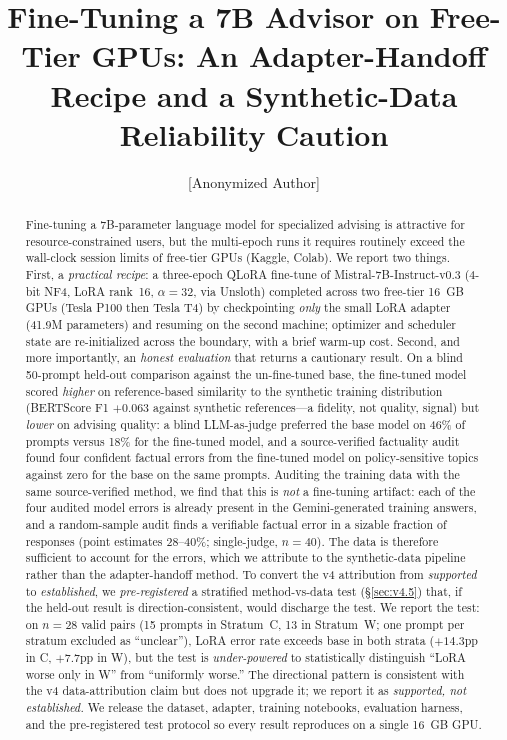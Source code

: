 \documentclass[11pt]{article}
\title{Fine-Tuning a 7B Advisor on Free-Tier GPUs: An Adapter-Handoff Recipe and a Synthetic-Data Reliability Caution}
\author{[Anonymized Author] \\
  [Anonymized Affiliation]}
\date{}
\begin{document}
\maketitle

\begin{abstract}
Fine-tuning a 7B-parameter language model for specialized advising is attractive for resource-constrained users, but the multi-epoch runs it requires routinely exceed the wall-clock session limits of free-tier GPUs (Kaggle, Colab). We report two things. First, a \emph{practical recipe}: a three-epoch QLoRA fine-tune of Mistral-7B-Instruct-v0.3 (4-bit NF4, LoRA rank~16, $\alpha=32$, via Unsloth) completed across two free-tier 16~GB GPUs (Tesla P100 then Tesla T4) by checkpointing \emph{only} the small LoRA adapter (41.9M parameters) and resuming on the second machine; optimizer and scheduler state are re-initialized across the boundary, with a brief warm-up cost. Second, and more importantly, an \emph{honest evaluation} that returns a cautionary result. On a blind 50-prompt held-out comparison against the un-fine-tuned base, the fine-tuned model scored \emph{higher} on reference-based similarity to the synthetic training distribution (BERTScore F1 $+0.063$ against synthetic references---a fidelity, not quality, signal) but \emph{lower} on advising quality: a blind LLM-as-judge preferred the base model on 46\% of prompts versus 18\% for the fine-tuned model, and a source-verified factuality audit found four confident factual errors from the fine-tuned model on policy-sensitive topics against zero for the base on the same prompts. Auditing the training data with the same source-verified method, we find that this is \emph{not} a fine-tuning artifact: each of the four audited model errors is already present in the Gemini-generated training answers, and a random-sample audit finds a verifiable factual error in a sizable fraction of responses (point estimates 28--40\%; single-judge, $n{=}40$). The data is therefore sufficient to account for the errors, which we attribute to the synthetic-data pipeline rather than the adapter-handoff method. To convert the v4 attribution from \emph{supported} to \emph{established}, we \emph{pre-registered} a stratified method-vs-data test (\S\ref{sec:v4.5}) that, if the held-out result is direction-consistent, would discharge the test. We report the test: on $n{=}28$ valid pairs (15 prompts in Stratum~C, 13 in Stratum~W; one prompt per stratum excluded as ``unclear''), LoRA error rate exceeds base in both strata ($+14.3$pp in C, $+7.7$pp in W), but the test is \emph{under-powered} to statistically distinguish ``LoRA worse only in W'' from ``uniformly worse.'' The directional pattern is consistent with the v4 data-attribution claim but does not upgrade it; we report it as \emph{supported, not established.} We release the dataset, adapter, training notebooks, evaluation harness, and the pre-registered test protocol so every result reproduces on a single 16~GB GPU.
\end{abstract}
\end{document}
